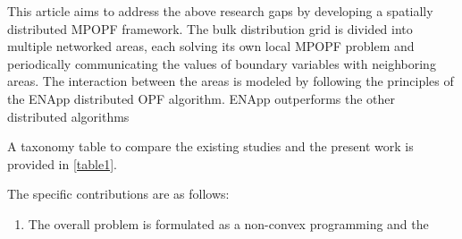 \documentclass{article}
\begin{document}
This article aims to address the above research gaps by developing a spatially distributed MPOPF framework. The bulk distribution grid is divided into multiple networked areas, each solving its own local MPOPF problem and periodically communicating the values of boundary variables with neighboring areas. The interaction between the areas is modeled by following the principles of the ENApp distributed OPF algorithm. ENApp outperforms the other distributed algorithms  

A taxonomy table to compare the existing studies and the present work is provided in \ref{table1}.





The specific contributions are as follows:
\begin{enumerate}
    \item The overall problem is formulated as a non-convex programming and the 
\end{enumerate}
\end{document}
